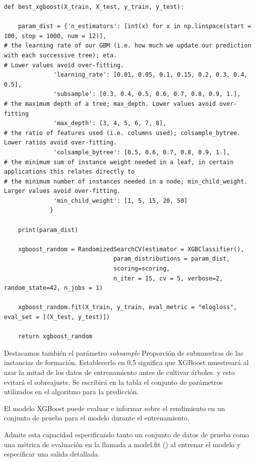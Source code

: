 \documentclass[12pt,twoside]{report}
\begin{document}
\begin{lstlisting}
def best_xgboost(X_train, X_test, y_train, y_test):
    
    param_dist = {'n_estimators': [int(x) for x in np.linspace(start = 100, stop = 1000, num = 12)],
# the learning rate of our GBM (i.e. how much we update our prediction with each successive tree); eta.
# Lower values avoid over-fitting.                  
              'learning_rate': [0.01, 0.05, 0.1, 0.15, 0.2, 0.3, 0.4, 0.5],
              'subsample': [0.3, 0.4, 0.5, 0.6, 0.7, 0.8, 0.9, 1.],
# the maximum depth of a tree; max_depth. Lower values avoid over-fitting                  
              'max_depth': [3, 4, 5, 6, 7, 8],
# the ratio of features used (i.e. columns used); colsample_bytree. Lower ratios avoid over-fitting.
              'colsample_bytree': [0.5, 0.6, 0.7, 0.8, 0.9, 1.],
# the minimum sum of instance weight needed in a leaf, in certain applications this relates directly to 
# the minimum number of instances needed in a node; min_child_weight. Larger values avoid over-fitting.                  
              'min_child_weight': [1, 5, 15, 20, 50]
             }
    
    print(param_dist)

    xgboost_random = RandomizedSearchCV(estimator = XGBClassifier(), 
                               param_distributions = param_dist, 
                               scoring=scoring, 
                               n_iter = 15, cv = 5, verbose=2, random_state=42, n_jobs = 1)
    
    xgboost_random.fit(X_train, y_train, eval_metric = "mlogloss", eval_set = [(X_test, y_test)])
    
    return xgboost_random
\end{lstlisting}

Destacamos también el parámetro \textit{subsample} Proporción de submuestras de las instancias de formación. Establecerlo en 0.5 significa que XGBoost muestreará al azar la mitad de los datos de entrenamiento antes de cultivar árboles. y esto evitará el sobreajuste. Se escribirá en la tabla el conjunto de parámetros utilizados en el algoritmo para la predicción.

El modelo XGBoost puede evaluar e informar sobre el rendimiento en un conjunto de prueba para el modelo durante el entrenamiento.

Admite esta capacidad especificando tanto un conjunto de datos de prueba como una métrica de evaluación en la llamada a model.fit () al entrenar el modelo y especificar una salida detallada.
\end{document}
